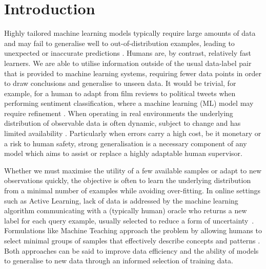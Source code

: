 \section{Introduction}
Highly tailored machine learning models typically require large amounts of data and may fail to generalise well to out-of-distribution examples, leading to unexpected or inaccurate predictions \cite{hand_classifier, Challen231, souza2020challenges}. Humans are, by contrast, relatively fast learners. We are able to utilise information outside of the usual data-label pair that is provided to machine learning systems, requiring fewer data points in order to draw conclusions and generalise to unseen data. It would be trivial, for example, for a human to adapt from film reviews to political tweets when performing sentiment classification, where a machine learning (ML) model may require refinement \cite{blitzer-etal-2007-biographies}. When operating in real environments the underlying distribution of observable data is often dynamic, subject to change and has limited availability \cite{Sahiner2023}. Particularly when errors carry a high cost, be it monetary or a risk to human safety, strong generalisation is a necessary component of any model which aims to assist or replace a highly adaptable human supervisor.

Whether we must maximise the utility of a few available samples or adapt to new observations quickly, the objective is often to learn the underlying distribution from a minimal number of examples while avoiding over-fitting. In online settings such as Active Learning, lack of data is addressed by the machine learning algorithm communicating with a (typically human) oracle who returns a new label for each query example, usually selected to reduce a form of uncertainty~\cite{prince2004does}. Formulations like Machine Teaching approach the problem by allowing humans to select minimal groups of samples that effectively describe concepts and patterns \cite{Zhu2015}. Both approaches can be said to improve data efficiency and the ability of models to generalise to new data through an informed selection of training data.

